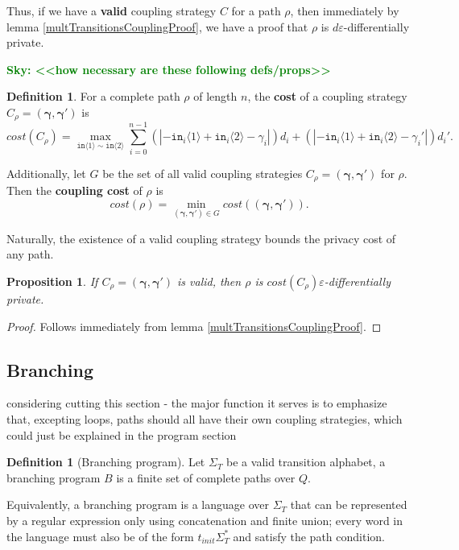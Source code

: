 \documentclass[12pt]{article}
\newcommand{\brangle}[1]{\langle#1 \rangle}
\newcommand{\todo}[2]{\textcolor{#1}{\textbf{#2}}}
\newcommand{\sky}[1]{\todo{green}{Sky: <<#1>>}}
\newtheorem{prop}[thm]{Proposition}
\theoremstyle{definition}
\newtheorem{defn}[thm]{Definition}
\begin{document}
Thus, if we have a \textbf{valid} coupling strategy $C$ for a path $\rho$, then immediately by lemma \ref{multTransitionsCouplingProof}, we have a proof that $\rho$ is $d\varepsilon$-differentially private. 

\sky{how necessary are these following defs/props}

\begin{defn}
    For a complete path $\rho$ of length $n$, the \textbf{cost} of a coupling strategy $C_\rho=(\bm{\gamma}, \bm{\gamma}')$ is \[cost(C_\rho) = \max_{\texttt{in}\brangle{1}\sim\texttt{in}\brangle{2}}\sum_{i=0}^{n-1}(|-\texttt{in}_i\brangle{1}+\texttt{in}_i\brangle{2}-\gamma_i|)d_i+(|-\texttt{in}_i\brangle{1}+\texttt{in}_i\brangle{2}-\gamma_i'|)d_i'.\]

    Additionally, let $G$ be the set of all valid coupling strategies $C_\rho=(\bm{\gamma}, \bm{\gamma}')$ for $\rho$. Then the \textbf{coupling cost} of $\rho$ is 
    \[cost(\rho) = \min_{(\bm{\gamma}, \bm{\gamma}')\in G}cost((\bm{\gamma}, \bm{\gamma}')).\]
\end{defn}

Naturally, the existence of a valid coupling strategy bounds the privacy cost of any path. 

\begin{prop}
    If $C_\rho=(\bm{\gamma}, \bm{\gamma}')$ is valid, then $\rho$ is $cost(C_\rho)\varepsilon$-differentially private.
\end{prop}

\begin{proof}
    Follows immediately from lemma \ref{multTransitionsCouplingProof}.
\end{proof}


\subsection{Branching} 
{\color{red} considering cutting this section - the major function it serves is to emphasize that, excepting loops, paths should all have their own coupling strategies, which could just be explained in the program section}


\begin{defn}[Branching program]
    Let $\Sigma_T$ be a valid transition alphabet, a branching program $B$ is a finite set of complete paths over $Q$.
\end{defn}

Equivalently, a branching program is a language over $\Sigma_T$ that can be represented by a regular expression only using concatenation and finite union; every word in the language must also be of the form $t_{init}\Sigma_T^*$ and satisfy the path condition. 
\end{document}

